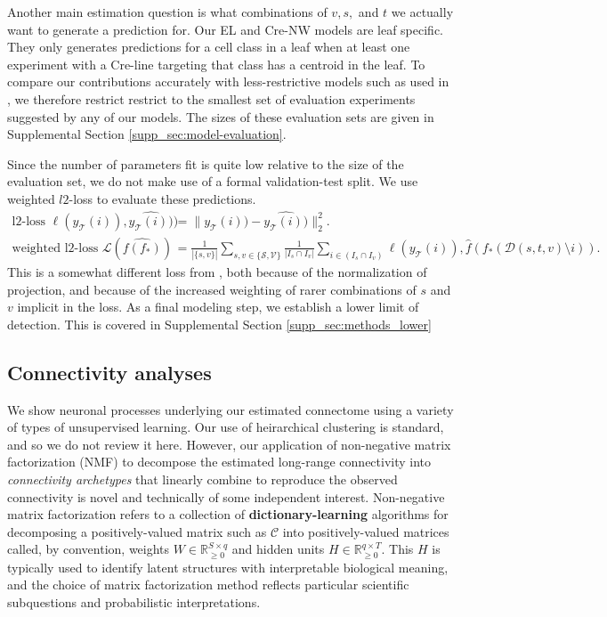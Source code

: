 Another main estimation question is what combinations of $v, s, $ and $t$ we actually want to generate a prediction for.
Our EL and Cre-NW models are leaf specific.
They only generates predictions for a cell class in a leaf when at least one experiment with a Cre-line targeting that class has a centroid in the leaf.
To compare our contributions accurately with less-restrictive models such as used in \citet{Knox2019-ot}, we therefore restrict restrict to the smallest set of evaluation experiments suggested by any of our models.
The sizes of these evaluation sets are given in Supplemental Section \ref{supp_sec:model-evaluation}.

Since the number of parameters fit is quite low relative to the size of the evaluation set, we do not make use of a formal validation-test split.
We use weighted $l2$-loss to evaluate these predictions.
\begin{align*}
\text{l2-loss } \ell (y_{\mathcal T}(i)),\widehat {y_{\mathcal T}(i))}) &=   \| y_{\mathcal T} (i)) - \widehat {y_{\mathcal T}(i))} \|_2^2. \\
\text{weighted l2-loss } \mathcal L ( \widehat {f(f_*)}) &= \frac{1}{|\{s,v\}|} \sum_{s,v \in \{\mathcal S,\mathcal V\}} \frac{1}{ |I_{s} \cap I_v |} \sum_{i \in (I_{s} \cap I_v ) } \ell (y_{\mathcal T}(i)), \hat f(f_*(\mathcal D(s,t,v) \setminus i)) .
\end{align*}
This is a somewhat different loss from \citet{Knox2019-ot}, both because of the normalization of projection, and because of the increased weighting of rarer combinations of $s$ and $v$ implicit in the loss.
As a final modeling step, we establish a lower limit of detection.
This is covered in Supplemental Section \ref{supp_sec:methods_lower}

\newpage

\newpage
\subsection{Connectivity analyses}

We show neuronal processes underlying our estimated connectome using a variety of types of unsupervised learning.
Our use of heirarchical clustering is standard, and so we do not review it here.
However, our application of non-negative matrix factorization (NMF) to decompose the estimated long-range connectivity into \textit{connectivity archetypes} that linearly combine to reproduce the observed connectivity is novel and technically of some independent interest.
Non-negative matrix factorization refers to a collection of \textbf{dictionary-learning} algorithms for decomposing a positively-valued matrix such as $\mathcal C $ into positively-valued matrices called, by convention, weights $W \in \mathbb R^{S \times q}_{\geq 0}$ and hidden units $H \in \mathbb R^{q  \times T}_{\geq 0}$.
This $H$ is typically used to identify latent structures with interpretable biological meaning, and the choice of matrix factorization method reflects particular scientific subquestions and probabilistic interpretations. 

